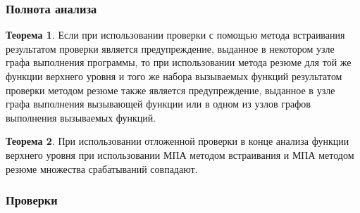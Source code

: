 \documentclass[hyperref={pdfpagelabels=false}]{beamer}
\begin{document}

\begin{frame}
\frametitle{Полнота анализа}
\textbf{Теорема 1}. Если при использовании проверки с помощью метода встраивания результатом проверки является предупреждение, выданное в некотором узле графа выполнения программы, то при использовании метода резюме для той же функции верхнего уровня и того же набора вызываемых функций результатом проверки методом резюме также является предупреждение, выданное в узле графа выполнения вызывающей функции или в одном из узлов графов выполнения вызываемых функций.

\textbf{Теорема 2}. При использовании отложенной проверки в конце анализа функции верхнего уровня при использовании МПА методом встраивания и МПА методом резюме множества срабатываний совпадают.
\end{frame}

\begin{frame}
\frametitle{Проверки}
\begin{figure}[h]
\end{figure}
\end{frame}
\end{document}
